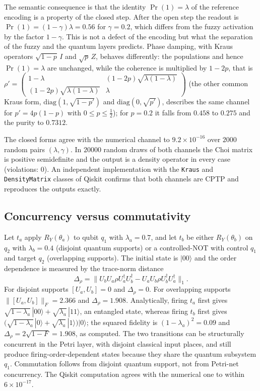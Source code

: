 \documentclass[final,3p,times]{elsarticle}
\begin{document}
The semantic consequence is that the identity $\Pr(1)=\lambda$ of the reference encoding is a property of the closed step. After the open step the readout is $\Pr(1)=(1-\gamma)\lambda=0.56$ for $\gamma=0.2$, which differs from the fuzzy activation by the factor $1-\gamma$. This is not a defect of the encoding but what the separation of the fuzzy and the quantum layers predicts. Phase damping, with Kraus operators $\sqrt{1-p}\,I$ and $\sqrt{p}\,Z$, behaves differently: the populations and hence $\Pr(1)=\lambda$ are unchanged, while the coherence is multiplied by $1-2p$, that is $\rho'=\begin{pmatrix}1-\lambda&(1-2p)\sqrt{\lambda(1-\lambda)}\\(1-2p)\sqrt{\lambda(1-\lambda)}&\lambda\end{pmatrix}$ (the other common Kraus form, $\mathrm{diag}(1,\sqrt{1-p'})$ and $\mathrm{diag}(0,\sqrt{p'})$, describes the same channel for $p'=4p(1-p)$ with $0\le p\le\tfrac12$); for $p=0.2$ it falls from $0.458$ to $0.275$ and the purity to $0.7312$.

The closed forms agree with the numerical channel to $9.2\times10^{-16}$ over $2000$ random pairs $(\lambda,\gamma)$. In $20000$ random draws of both channels the Choi matrix is positive semidefinite and the output is a density operator in every case (violations: $0$). An independent implementation with the \texttt{Kraus} and \texttt{DensityMatrix} classes of Qiskit confirms that both channels are CPTP and reproduces the outputs exactly.

\subsection{Concurrency versus commutativity}
Let $t_a$ apply $R_Y(\theta_a)$ to qubit $q_1$ with $\lambda_a=0.7$, and let $t_b$ be either $R_Y(\theta_b)$ on $q_2$ with $\lambda_b=0.4$ (disjoint quantum supports) or a controlled-NOT with control $q_1$ and target $q_2$ (overlapping supports). The initial state is $|00\rangle$ and the order dependence is measured by the trace-norm distance
\begin{equation}
 \Delta_\rho=\big\|U_bU_a\rho U_a^\dagger U_b^\dagger-U_aU_b\rho U_b^\dagger U_a^\dagger\big\|_1 .
\end{equation}
For disjoint supports $[U_a,U_b]=0$ and $\Delta_\rho=0$. For overlapping supports $\|[U_a,U_b]\|_F=2.366$ and $\Delta_\rho=1.908$. Analytically, firing $t_a$ first gives $\sqrt{1-\lambda_a}\,|00\rangle+\sqrt{\lambda_a}\,|11\rangle$, an entangled state, whereas firing $t_b$ first gives $\big(\sqrt{1-\lambda_a}\,|0\rangle+\sqrt{\lambda_a}\,|1\rangle\big)|0\rangle$; the squared fidelity is $(1-\lambda_a)^2=0.09$ and $\Delta_\rho=2\sqrt{1-F}=1.908$, as computed. The two transitions can be structurally concurrent in the Petri layer, with disjoint classical input places, and still produce firing-order-dependent states because they share the quantum subsystem $q_1$. Commutation follows from disjoint quantum support, not from Petri-net concurrency. The Qiskit computation agrees with the numerical one to within $6\times10^{-17}$.
\end{document}
